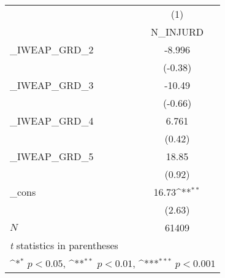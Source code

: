 {
\def\sym#1{\ifmmode^{#1}\else\(^{#1}\)\fi}
\begin{tabular}{l*{1}{c}}
\hline\hline
            &\multicolumn{1}{c}{(1)}\\
            &\multicolumn{1}{c}{N\_INJURD}\\
\hline
\_IWEAP\_GRD\_2&      -8.996         \\
            &     (-0.38)         \\
[1em]
\_IWEAP\_GRD\_3&      -10.49         \\
            &     (-0.66)         \\
[1em]
\_IWEAP\_GRD\_4&       6.761         \\
            &      (0.42)         \\
[1em]
\_IWEAP\_GRD\_5&       18.85         \\
            &      (0.92)         \\
[1em]
\_cons      &       16.73\sym{**} \\
            &      (2.63)         \\
\hline
\(N\)       &       61409         \\
\hline\hline
\multicolumn{2}{l}{\footnotesize \textit{t} statistics in parentheses}\\
\multicolumn{2}{l}{\footnotesize \sym{*} \(p<0.05\), \sym{**} \(p<0.01\), \sym{***} \(p<0.001\)}\\
\end{tabular}
}

